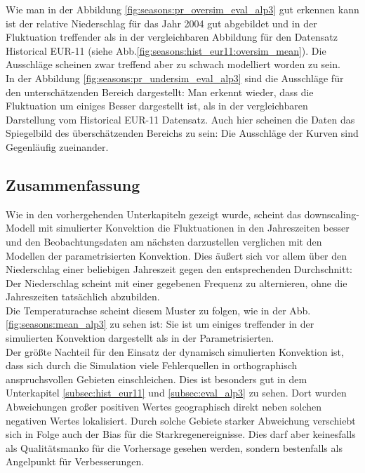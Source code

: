 Wie man in der Abbildung \ref{fig:seasons:pr_oversim_eval_alp3} gut erkennen kann ist der relative Niederschlag für das Jahr 2004 gut abgebildet und in der Fluktuation treffender als in der vergleichbaren Abbildung  für den Datensatz Historical EUR-11 (siehe Abb.\ref{fig:seasons:hist_eur11:oversim_mean}). Die Ausschläge scheinen zwar treffend aber zu schwach modelliert worden zu sein.\\
In der Abbildung \ref{fig:seasons:pr_undersim_eval_alp3} sind die Ausschläge für den unterschätzenden Bereich dargestellt: Man erkennt wieder, dass die Fluktuation um einiges Besser dargestellt ist, als in der vergleichbaren Darstellung vom Historical EUR-11 Datensatz. Auch hier scheinen die Daten das Spiegelbild des überschätzenden Bereichs zu sein: Die Ausschläge der Kurven sind Gegenläufig zueinander.\newpage
\subsection{Zusammenfassung}
Wie in den vorhergehenden Unterkapiteln gezeigt wurde, scheint das downscaling-Modell mit simulierter Konvektion die Fluktuationen in den Jahreszeiten besser und den Beobachtungsdaten am nächsten darzustellen verglichen mit den Modellen der parametrisierten Konvektion. Dies äußert sich vor allem über den Niederschlag einer beliebigen Jahreszeit gegen den entsprechenden Durchschnitt: Der Niederschlag scheint mit einer gegebenen Frequenz zu alternieren, ohne die Jahreszeiten tatsächlich abzubilden.\\
Die Temperaturachse scheint diesem Muster zu folgen, wie in der Abb.\ref{fig:seasons:mean_alp3} zu sehen ist: Sie ist um einiges treffender in der simulierten Konvektion dargestellt als in der Parametrisierten.\\
Der größte Nachteil für den Einsatz der dynamisch simulierten Konvektion ist, dass sich durch die Simulation viele Fehlerquellen in orthographisch anspruchsvollen Gebieten einschleichen. Dies ist besonders gut in dem Unterkapitel \ref{subsec:hist_eur11} und \ref{subsec:eval_alp3} zu sehen. Dort wurden Abweichungen großer positiven Wertes geographisch direkt neben solchen negativen Wertes lokalisiert. Durch solche Gebiete starker Abweichung verschiebt sich in Folge auch der Bias für die Starkregenereignisse. Dies darf aber keinesfalls als Qualitätsmanko für die Vorhersage gesehen werden, sondern bestenfalls als Angelpunkt für Verbesserungen.\\
